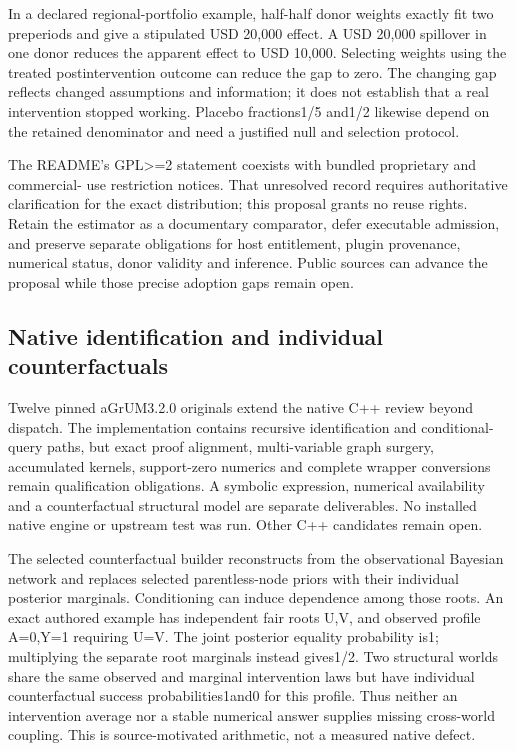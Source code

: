 In a declared regional-portfolio example, half-half donor weights
exactly fit two preperiods and give a stipulated USD 20,000 effect. A
USD 20,000 spillover in one donor reduces the apparent effect to USD
10,000. Selecting weights using the treated postintervention outcome can
reduce the gap to zero. The changing gap reflects changed assumptions
and information; it does not establish that a real intervention stopped
working. Placebo fractions1/5 and1/2 likewise depend on the retained
denominator and need a justified null and selection protocol.
\citep{exec19_synth_contract_reference}

The README's GPL\textgreater=2 statement coexists with bundled
proprietary and commercial- use restriction notices. That unresolved
record requires authoritative clarification for the exact distribution;
this proposal grants no reuse rights. Retain the estimator as a
documentary comparator, defer executable admission, and preserve
separate obligations for host entitlement, plugin provenance, numerical
status, donor validity and inference. Public sources can advance the
proposal while those precise adoption gaps remain open.
\citep{exec19_synth_stata_source}

\hypertarget{native-identification-and-individual-counterfactuals}{%
\subsection{Native identification and individual
counterfactuals}\label{native-identification-and-individual-counterfactuals}}

Twelve pinned aGrUM3.2.0 originals extend the native C++ review beyond
dispatch. The implementation contains recursive identification and
conditional-query paths, but exact proof alignment, multi-variable graph
surgery, accumulated kernels, support-zero numerics and complete wrapper
conversions remain qualification obligations. A symbolic expression,
numerical availability and a counterfactual structural model are
separate deliverables. No installed native engine or upstream test was
run. Other C++ candidates remain open.
\citep{exec19_cxx_identification_source}

The selected counterfactual builder reconstructs from the observational
Bayesian network and replaces selected parentless-node priors with their
individual posterior marginals. Conditioning can induce dependence among
those roots. An exact authored example has independent fair roots U,V,
and observed profile A=0,Y=1 requiring U=V. The joint posterior equality
probability is1; multiplying the separate root marginals instead
gives1/2. Two structural worlds share the same observed and marginal
intervention laws but have individual counterfactual success
probabilities1and0 for this profile. Thus neither an intervention
average nor a stable numerical answer supplies missing cross-world
coupling. This is source-motivated arithmetic, not a measured native
defect.
\citep{exec19_cxx_identification_source,exec19_cxx_identification_reference}

